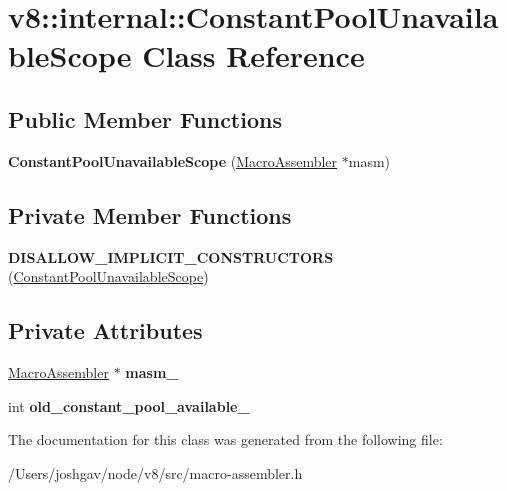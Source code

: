 \hypertarget{classv8_1_1internal_1_1_constant_pool_unavailable_scope}{}\section{v8\+:\+:internal\+:\+:Constant\+Pool\+Unavailable\+Scope Class Reference}
\label{classv8_1_1internal_1_1_constant_pool_unavailable_scope}
\subsection*{Public Member Functions}
\begin{DoxyCompactItemize}
\item 
{\bfseries Constant\+Pool\+Unavailable\+Scope} (\hyperlink{classv8_1_1internal_1_1_macro_assembler}{Macro\+Assembler} $\ast$masm)\hypertarget{classv8_1_1internal_1_1_constant_pool_unavailable_scope_ae10c8d1308e4241e6cdc1a561f689174}{}\label{classv8_1_1internal_1_1_constant_pool_unavailable_scope_ae10c8d1308e4241e6cdc1a561f689174}

\end{DoxyCompactItemize}
\subsection*{Private Member Functions}
\begin{DoxyCompactItemize}
\item 
{\bfseries D\+I\+S\+A\+L\+L\+O\+W\+\_\+\+I\+M\+P\+L\+I\+C\+I\+T\+\_\+\+C\+O\+N\+S\+T\+R\+U\+C\+T\+O\+RS} (\hyperlink{classv8_1_1internal_1_1_constant_pool_unavailable_scope}{Constant\+Pool\+Unavailable\+Scope})\hypertarget{classv8_1_1internal_1_1_constant_pool_unavailable_scope_a6e2dd666ceb462e662b18185e12138a4}{}\label{classv8_1_1internal_1_1_constant_pool_unavailable_scope_a6e2dd666ceb462e662b18185e12138a4}

\end{DoxyCompactItemize}
\subsection*{Private Attributes}
\begin{DoxyCompactItemize}
\item 
\hyperlink{classv8_1_1internal_1_1_macro_assembler}{Macro\+Assembler} $\ast$ {\bfseries masm\+\_\+}\hypertarget{classv8_1_1internal_1_1_constant_pool_unavailable_scope_a508a18047e9470a91256bc5d5f0edb4d}{}\label{classv8_1_1internal_1_1_constant_pool_unavailable_scope_a508a18047e9470a91256bc5d5f0edb4d}

\item 
int {\bfseries old\+\_\+constant\+\_\+pool\+\_\+available\+\_\+}\hypertarget{classv8_1_1internal_1_1_constant_pool_unavailable_scope_a091befacb414c0547a625deb08e59fb2}{}\label{classv8_1_1internal_1_1_constant_pool_unavailable_scope_a091befacb414c0547a625deb08e59fb2}

\end{DoxyCompactItemize}


The documentation for this class was generated from the following file\+:\begin{DoxyCompactItemize}
\item 
/\+Users/joshgav/node/v8/src/macro-\/assembler.\+h\end{DoxyCompactItemize}
